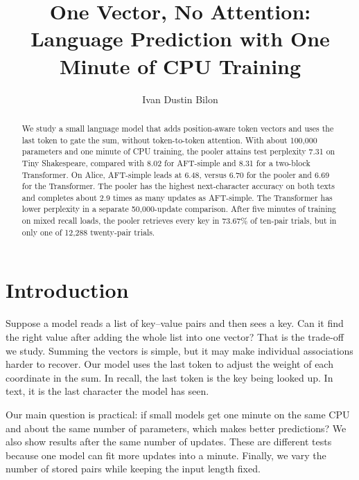 \documentclass[11pt]{article}
\title{One Vector, No Attention:\\Language Prediction with One Minute of CPU Training}
\author{Ivan Dustin Bilon}
\date{}
\begin{document}
\maketitle
\begin{abstract}
We study a small language model that adds position-aware token vectors and uses the last token to gate the sum, without token-to-token attention. With about 100,000 parameters and one minute of CPU training, the pooler attains test perplexity 7.31 on Tiny Shakespeare, compared with 8.02 for AFT-simple and 8.31 for a two-block Transformer. On Alice, AFT-simple leads at 6.48, versus 6.70 for the pooler and 6.69 for the Transformer. The pooler has the highest next-character accuracy on both texts and completes about 2.9 times as many updates as AFT-simple. The Transformer has lower perplexity in a separate 50,000-update comparison. After five minutes of training on mixed recall loads, the pooler retrieves every key in 73.67\% of ten-pair trials, but in only one of 12,288 twenty-pair trials.
\end{abstract}

\section{Introduction}
Suppose a model reads a list of key--value pairs and then sees a key. Can it find the right value after adding the whole list into one vector? That is the trade-off we study. Summing the vectors is simple, but it may make individual associations harder to recover. Our model uses the last token to adjust the weight of each coordinate in the sum. In recall, the last token is the key being looked up. In text, it is the last character the model has seen.

Our main question is practical: if small models get one minute on the same CPU and about the same number of parameters, which makes better predictions? We also show results after the same number of updates. These are different tests because one model can fit more updates into a minute. Finally, we vary the number of stored pairs while keeping the input length fixed.
\end{document}
